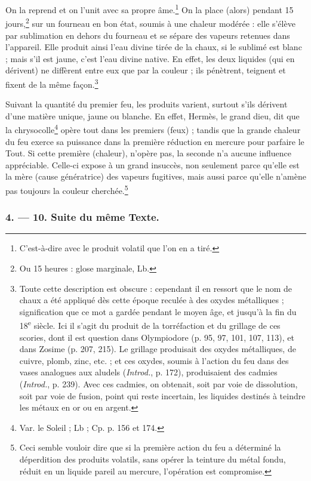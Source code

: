 \documentclass[a4paper, 11pt, oneside, polutonikogreek, french]{article}
\begin{document}
On la reprend et on l'unit avec sa propre âme.\footnote{C'est-à-dire avec le produit volatil que l'on en a tiré.} On la place (alors) pendant 15 jours,\footnote{Ou 15 heures : glose marginale, Lb.} sur un fourneau en bon état, soumis à une chaleur modérée : elle s'élève par sublimation en dehors du fourneau et se sépare des vapeurs retenues dans l'appareil. Elle produit ainsi l'eau divine tirée de la chaux, si le sublimé est blanc ; mais s'il est jaune, c'est l'eau divine native. En effet, les deux liquides (qui en dérivent) ne diffèrent entre eux que par la couleur ; ils pénètrent, teignent et fixent de la même façon.\footnote{Toute cette description est obscure : cependant il en ressort que le nom de chaux a été appliqué dès cette époque reculée à des oxydes métalliques ; signification que ce mot a gardée pendant le moyen âge, et jusqu'à la fin du 18\textsuperscript{e} siècle. Ici il s'agit du produit de la torréfaction et du grillage de ces scories, dont il est question dans Olympiodore (p. 95, 97, 101, 107, 113), et dans Zosime (p. 207, 215). Le grillage produisait des oxydes métalliques, de cuivre, plomb, zinc, etc. ; et ces oxydes, soumis à l'action du feu dans des vases analogues aux aludels (\emph{Introd.}, p. 172), produisaient des cadmies (\emph{Introd.}, p. 239). Avec ces cadmies, on obtenait, soit par voie de dissolution, soit par voie de fusion, point qui reste incertain, les liquides destinés à teindre les métaux en or ou en argent.}

Suivant la quantité du premier feu, les produits varient, surtout s'ils dérivent d'une matière unique, jaune ou blanche. En effet, Hermès, le grand dieu, dit que la chrysocolle\footnote{Var. le Soleil ; Lb ; Cp. p. 156 et 174.} opère tout dans les premiers (feux) ; tandis que la grande chaleur du feu exerce sa puissance dans la première réduction en mercure pour parfaire le Tout. Si cette première (chaleur), n'opère pas, la seconde n'a aucune influence appréciable. Celle-ci expose à un grand insuccès, non seulement parce qu'elle est la mère (cause génératrice) des vapeurs fugitives, mais aussi parce qu'elle n'amène pas toujours la couleur cherchée.\footnote{Ceci semble vouloir dire que si la première action du feu a déterminé la déperdition des produits volatils, sans opérer la teinture du métal fondu, réduit en un liquide pareil au mercure, l'opération est compromise.}

\bigskip
\centerline{\EightStarTaper}
\centerline{\EightStarTaper\EightStarTaper}
\bigskip

\subsubsection{4. --- 10. Suite du même Texte.}
\end{document}
